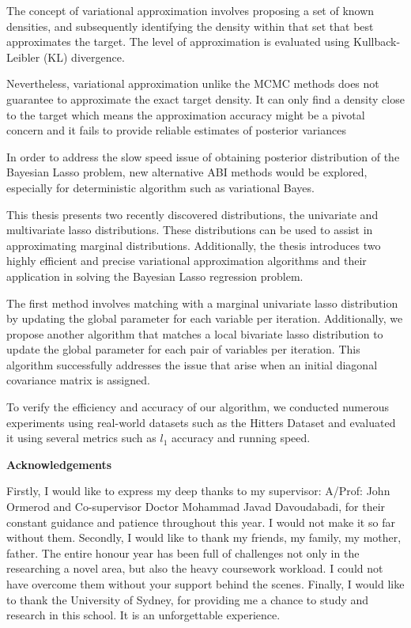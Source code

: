The concept of variational approximation involves proposing a set of known densities, and subsequently identifying the density within that set that best approximates the target. The level of approximation is evaluated using Kullback-Leibler (KL) divergence.

Nevertheless, variational approximation unlike the MCMC methods does not guarantee to approximate the exact target density. It can only find a density close to the target which means the approximation accuracy might  be a pivotal concern and it fails to provide reliable estimates of posterior variances

In order to address the slow speed issue of obtaining posterior distribution of the Bayesian Lasso problem, new alternative ABI methods would be explored, especially for deterministic algorithm such as variational Bayes.

This thesis presents two recently discovered distributions, the univariate and multivariate lasso distributions. These distributions can be used to assist in approximating marginal distributions. Additionally, the thesis introduces two highly efficient and precise variational approximation algorithms and their application in solving the Bayesian Lasso regression problem.


The first method involves matching with a marginal univariate lasso distribution by updating the global parameter for each variable per iteration. Additionally, we propose another algorithm that matches a local bivariate lasso distribution to update the global parameter for each pair of variables per iteration. This algorithm successfully addresses the issue that arise when an initial diagonal covariance matrix is assigned.

To verify the efficiency and accuracy of our algorithm, we conducted numerous experiments using real-world datasets such as the Hitters Dataset and evaluated it using several metrics such as $l_1$ accuracy and running speed.


\newpage

\begin{center}
    \textbf{\large Acknowledgements}\\
    \vspace{0.5cm}
\end{center}
	Firstly, I would like to express my deep thanks to my supervisor: A/Prof: John Ormerod and Co-supervisor Doctor Mohammad Javad Davoudabadi, for their constant guidance and patience throughout this year. I would not make it so far without them.
   	Secondly, I would like to thank my friends, my family, my mother, father. The entire honour year has been full of challenges not only in the researching a novel area, but also the heavy coursework workload. I could not have overcome them without your support behind the scenes.
    Finally, I would like to thank the University of Sydney, for providing me a chance to study and research in this school. It is an unforgettable experience.
\vfill
\hspace{0pt}
\pagebreak
\newpage